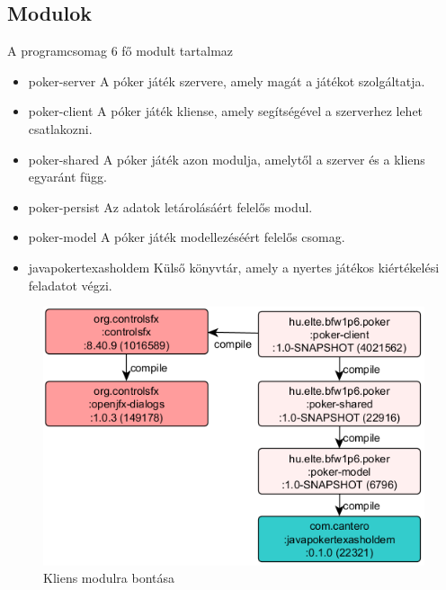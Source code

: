 \subsection{Modulok}
A programcsomag 6 fő modult tartalmaz
\begin{itemize}
  \item poker-server
  A póker játék szervere, amely magát a játékot szolgáltatja.
  \item poker-client
  A póker játék kliense, amely segítségével a szerverhez lehet csatlakozni.
  \item poker-shared
  A póker játék azon modulja, amelytől a szerver és a kliens egyaránt függ.
  \item poker-persist
  Az adatok letárolásáért felelős modul.
  \item poker-model
  A póker játék modellezéséért felelős csomag.
  \item javapokertexasholdem
  Külső könyvtár, amely a nyertes játékos kiértékelési feladatot végzi.
\end{itemize}
\begin{figure}[h!]
	\caption{Kliens modulra bontása}
	\centering
	\includegraphics{user-documentation/images/poker-client-deps.png}
\end{figure}
